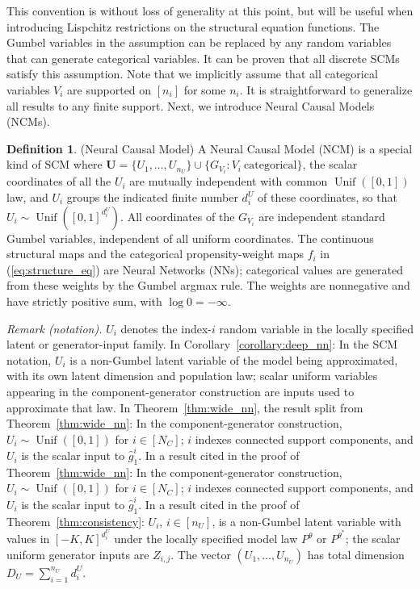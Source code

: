 \documentclass[12pt]{article}
\theoremstyle{plain}
\theoremstyle{definition}
\newtheorem{definition}[theorem]{Definition}
\theoremstyle{remark}
\begin{document}
This convention is without loss of generality at this point, but will be useful when introducing Lispchitz restrictions on the structural equation functions.
The Gumbel variables in the assumption can be replaced by any random variables that can generate categorical variables. It can be proven that all discrete SCMs satisfy this assumption. Note that we implicitly assume that all categorical variables $V_i$ are supported on $[n_i]$ for some $n_i$. It is straightforward to generalize all results to any finite support. Next, we introduce Neural Causal Models (NCMs).

\begin{definition}
(Neural Causal Model) A Neural Causal Model (NCM) is a special kind of SCM where $\boldsymbol U=\{U_1,\ldots,U_{n_U}\}\cup\{G_{V_i}:V_i\ \text{categorical}\}$, the scalar coordinates of all the $U_i$ are mutually independent with common $\operatorname{Unif}([0,1])$ law, and $U_i$ groups the indicated finite number $d_i^U$ of these coordinates, so that $U_i\sim\operatorname{Unif}([0,1]^{d_i^U})$. All coordinates of the $G_{V_i}$ are independent standard Gumbel variables, independent of all uniform coordinates. The continuous structural maps and the categorical propensity-weight maps $f_i$ in (\ref{eq:structure_eq}) are Neural Networks (NNs); categorical values are generated from these weights by the Gumbel argmax rule. The weights are nonnegative and have strictly positive sum, with $\log0=-\infty$.
\end{definition}

\noindent\textit{Remark (notation).} $U_i$ denotes the index-$i$ random variable in the locally specified latent or generator-input family. In Corollary~\ref{corollary:deep_nn}: In the SCM notation, $U_i$ is a non-Gumbel latent variable of the model being approximated, with its own latent dimension and population law; scalar uniform variables appearing in the component-generator construction are inputs used to approximate that law. In Theorem~\ref{thm:wide_nn}, the result split from Theorem~\ref{thm:wide_nn}: In the component-generator construction, $U_i\sim\operatorname{Unif}([0,1])$ for $i\in[N_C]$; $i$ indexes connected support components, and $U_i$ is the scalar input to $\hat g_1^i$. In a result cited in the proof of Theorem~\ref{thm:wide_nn}: In the component-generator construction, $U_i\sim\operatorname{Unif}([0,1])$ for $i\in[N_C]$; $i$ indexes connected support components, and $U_i$ is the scalar input to $\hat g_1^i$. In a result cited in the proof of Theorem~\ref{thm:consistency}: $U_i$, $i\in[n_U]$, is a non-Gumbel latent variable with values in $[-K,K]^{d_i^U}$ under the locally specified model law $P^\theta$ or $P^{\theta^*}$; the scalar uniform generator inputs are $Z_{i,j}$. The vector $(U_1,\ldots,U_{n_U})$ has total dimension $D_U=\sum_{i=1}^{n_U}d_i^U$.
\end{document}
